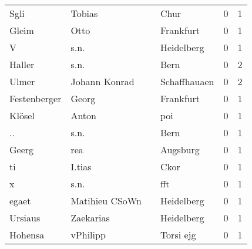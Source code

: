 \begin{center}
\begin{tiny}
\begin{longtabu}{llllrr}
                     Sgli &                             Tobias &             &                                        Chur &          0 &         1 \\
                    Gleim &                               Otto &             &                                   Frankfurt &          0 &         1 \\
                        V &                               s.n. &             &                                  Heidelberg &          0 &         1 \\
                   Haller &                               s.n. &             &                                        Bern &          0 &         2 \\
                    Ulmer &                      Johann Konrad &             &                                Schaffhauaen &          0 &         2 \\
             Festenberger &                              Georg &             &                                   Frankfurt &          0 &         1 \\
                   Klösel &                              Anton &             &                                         poi &          0 &         1 \\
                       .. &                               s.n. &             &                                        Bern &          0 &         1 \\
                    Geerg &                                rea &             &                                    Augsburg &          0 &         1 \\
                       ti &                             I.tias &             &                                        Ckor &          0 &         1 \\
                        x &                               s.n. &             &                                         fft &          0 &         1 \\
                    egaet &                     Matihieu CSoWn &             &                                  Heidelberg &          0 &         1 \\
                  Ursiaus &                          Zaekarias &             &                                  Heidelberg &          0 &         1 \\
                  Hohensa &                           vPhilipp &             &                                   Torsi ejg &          0 &         1 \\

\end{longtabu}
\end{tiny}
\end{center}
